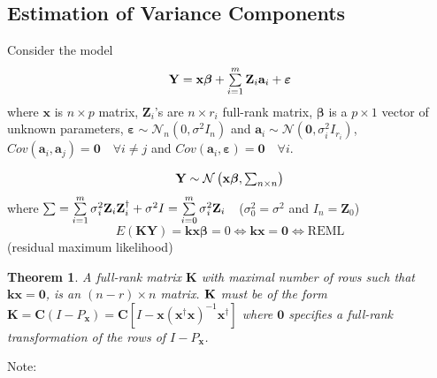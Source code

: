 \documentclass{article}
\newtheorem{theorem}{Theorem}
\begin{document}
\bigskip

\subsection{Estimation of Variance Components}

Consider the model%
\begin{equation*}
\mathbf{Y}=\mathbf{x\beta }+\tsum\limits_{i=1}^{m}\mathbf{Z}_{i}\mathbf{a}%
_{i}+\mathbf{\varepsilon }
\end{equation*}%
where $\mathbf{x}$ is $n\times p$ matrix, $\mathbf{Z}_{i}$'s are $n\times
r_{i}$ full-rank matrix, $\mathbf{\beta }$ is a $p\times 1$ vector of
unknown parameters, $\mathbf{\varepsilon \sim }\mathcal{N}_{n}\left(
0,\sigma ^{2}I_{n}\right) $ and $\mathbf{a}_{i}\sim \mathcal{N}\left( 
\mathbf{0},\sigma _{i}^{2}I_{r_{i}}\right) $, $Cov\left( \mathbf{a}_{i},%
\mathbf{a}_{j}\right) =\mathbf{0}\quad \forall i\neq j$ and $Cov\left( 
\mathbf{a}_{i},\mathbf{\varepsilon }\right) =\mathbf{0}\quad \forall i$.

\bigskip

\begin{equation*}
\therefore \mathbf{Y}\sim \mathcal{N}\left( \mathbf{x\beta }%
,\tsum\nolimits_{n\times n}\right)
\end{equation*}%
where $\tsum =\tsum\limits_{i=1}^{m}\sigma _{i}^{2}\mathbf{Z}_{i}\mathbf{Z}%
_{i}^{\dagger }+\sigma ^{2}I=\tsum\limits_{i=0}^{m}\sigma _{i}^{2}\mathbf{Z}%
_{i}\quad $($\sigma _{0}^{2}=\sigma ^{2}$ and $I_{n}=\mathbf{Z}_{0}$)%
\begin{equation*}
E\left( \mathbf{KY}\right) =\mathbf{kx\beta }=0\Leftrightarrow \mathbf{kx}=%
\mathbf{0}\Leftrightarrow \text{REML}
\end{equation*}%
(residual maximum likelihood)

\bigskip

\begin{theorem}
A full-rank matrix $\mathbf{K}$ with maximal number of rows such that $%
\mathbf{kx}=\mathbf{0}$, is an $\left( n-r\right) \times n$ matrix. $\mathbf{%
K}$ must be of the form $\mathbf{K}=\mathbf{C}\left( I-P_{\mathbf{x}}\right)
=\mathbf{C}\left[ I-\mathbf{x}\left( \mathbf{x}^{\dagger }\mathbf{x}\right)
^{-1}\mathbf{x}^{\dagger }\right] $ where $\mathbf{0}$ specifies a full-rank
transformation of the rows of $I-P_{\mathbf{x}}$.
\end{theorem}

\bigskip

Note:
\end{document}
